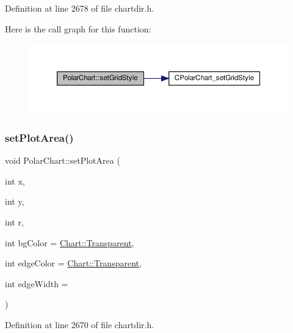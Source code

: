 Definition at line 2678 of file chartdir.\+h.

Here is the call graph for this function\+:
\nopagebreak
\begin{figure}[H]
\begin{center}
\leavevmode
\includegraphics[width=350pt]{class_polar_chart_a088600a8966e89904181d33842077e15_cgraph}
\end{center}
\end{figure}
\mbox{\label{class_polar_chart_adc36a42598e36330c451bab063739494}} 
\subsubsection{\texorpdfstring{set\+Plot\+Area()}{setPlotArea()}}
{\footnotesize\ttfamily void Polar\+Chart\+::set\+Plot\+Area (\begin{DoxyParamCaption}\item[{int}]{x,  }\item[{int}]{y,  }\item[{int}]{r,  }\item[{int}]{bg\+Color = {\ttfamily \hyperlink{namespace_chart_abee0d882fdc9ad0b001245ad9fc64011afc6811800a9e2582dac0157b6279f836}{Chart\+::\+Transparent}},  }\item[{int}]{edge\+Color = {\ttfamily \hyperlink{namespace_chart_abee0d882fdc9ad0b001245ad9fc64011afc6811800a9e2582dac0157b6279f836}{Chart\+::\+Transparent}},  }\item[{int}]{edge\+Width = {} }\end{DoxyParamCaption})\hspace{0.3cm}{\ttfamily [inline]}}



Definition at line 2670 of file chartdir.\+h.

